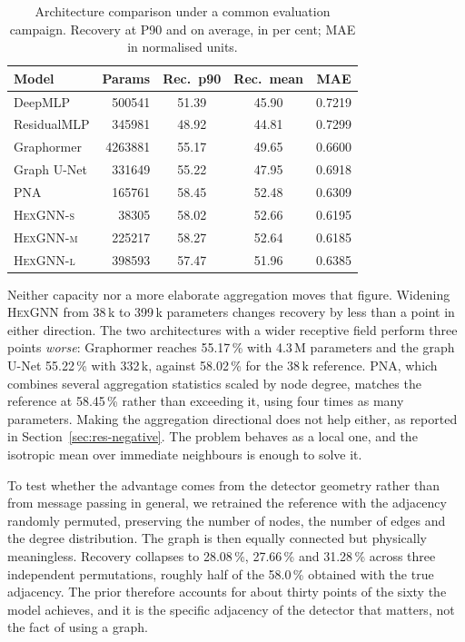 \documentclass[10pt,conference]{IEEEtran}
\begin{document}
\begin{table}[t]
\centering
\caption{Architecture comparison under a common evaluation campaign. Recovery
at P90 and on average, in per cent; MAE in normalised units.}
\label{tab:architectures}
\begin{tabular}{@{}lrccc@{}}
\toprule
\textbf{Model} & \textbf{Params} & \textbf{Rec.\ p90} & \textbf{Rec.\ mean} & \textbf{MAE} \\
\midrule
DeepMLP           & \num{500541}  & 51.39 & 45.90 & 0.7219 \\
ResidualMLP       & \num{345981}  & 48.92 & 44.81 & 0.7299 \\
Graphormer        & \num{4263881} & 55.17 & 49.65 & 0.6600 \\
Graph U-Net       & \num{331649}  & 55.22 & 47.95 & 0.6918 \\
PNA               & \num{165761}  & 58.45 & 52.48 & 0.6309 \\
\textsc{HexGNN-s} & \num{38305}   & 58.02 & 52.66 & 0.6195 \\
\textsc{HexGNN-m} & \num{225217}  & 58.27 & 52.64 & 0.6185 \\
\textsc{HexGNN-l} & \num{398593}  & 57.47 & 51.96 & 0.6385 \\
\bottomrule
\end{tabular}
\end{table}
Neither capacity nor a more elaborate aggregation moves that figure. Widening
\textsc{HexGNN} from 38\,k to 399\,k parameters changes recovery by less than a
point in either direction. The two architectures with a wider receptive field
perform three points \emph{worse}: Graphormer reaches 55.17\,\% with 4.3\,M
parameters and the graph U-Net 55.22\,\% with 332\,k, against 58.02\,\% for the
38\,k reference. PNA, which combines several aggregation statistics scaled by
node degree, matches the reference at 58.45\,\% rather than exceeding it, using
four times as many parameters. Making the aggregation directional does not help
either, as reported in Section~\ref{sec:res-negative}. The problem behaves as a
local one, and the isotropic mean over immediate neighbours is enough to solve
it.

To test whether the advantage comes from the detector geometry rather than from
message passing in general, we retrained the reference with the adjacency
randomly permuted, preserving the number of nodes, the number of edges and the
degree distribution. The graph is then equally connected but physically
meaningless. Recovery collapses to 28.08\,\%, 27.66\,\% and 31.28\,\% across three
independent permutations, roughly half of the 58.0\,\% obtained with the true
adjacency. The prior therefore accounts for about thirty points of the sixty
the model achieves, and it is the specific adjacency of the detector that
matters, not the fact of using a graph.
\end{document}
